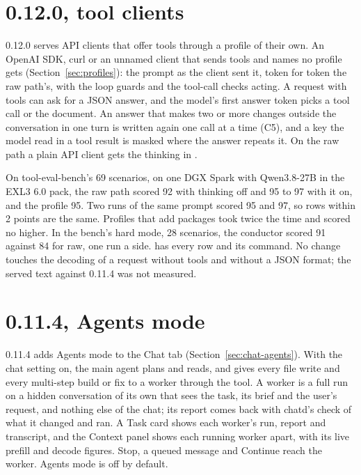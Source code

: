 \section{0.12.0, tool clients}\label{sec:changelog-0120}

0.12.0 serves API clients that offer tools through a profile of their own. An OpenAI SDK, curl or an unnamed client that sends tools and names no profile gets  (Section~\ref{sec:profiles}): the prompt as the client sent it, token for token the raw path's, with the loop guards and the tool-call checks acting. A request with tools can ask for a JSON answer, and the model's first answer token picks a tool call or the document. An answer that makes two or more changes outside the conversation in one turn is written again one call at a time (C5), and a key the model read in a tool result is masked where the answer repeats it. On the raw path a plain API client gets the thinking in .

On tool-eval-bench's 69 scenarios, on one DGX Spark with Qwen3.8-27B in the EXL3 6.0 pack, the raw path scored 92 with thinking off and 95 to 97 with it on, and the  profile 95. Two runs of the same prompt scored 95 and 97, so rows within 2 points are the same. Profiles that add packages took twice the time and scored no higher. In the bench's hard mode, 28 scenarios, the conductor scored 91 against 84 for raw, one run a side.  has every row and its command. No change touches the decoding of a request without tools and without a JSON format; the served text against 0.11.4 was not measured.

\section{0.11.4, Agents mode}\label{sec:changelog-0114}

0.11.4 adds Agents mode to the Chat tab (Section~\ref{sec:chat-agents}). With the chat setting  on, the main agent plans and reads, and gives every file write and every multi-step build or fix to a worker through the  tool. A worker is a full run on a hidden conversation of its own that sees the task, its brief and the user's request, and nothing else of the chat; its report comes back with chatd's check of what it changed and ran. A Task card shows each worker's run, report and transcript, and the Context panel shows each running worker apart, with its live prefill and decode figures. Stop, a queued message and Continue reach the worker. Agents mode is off by default.

